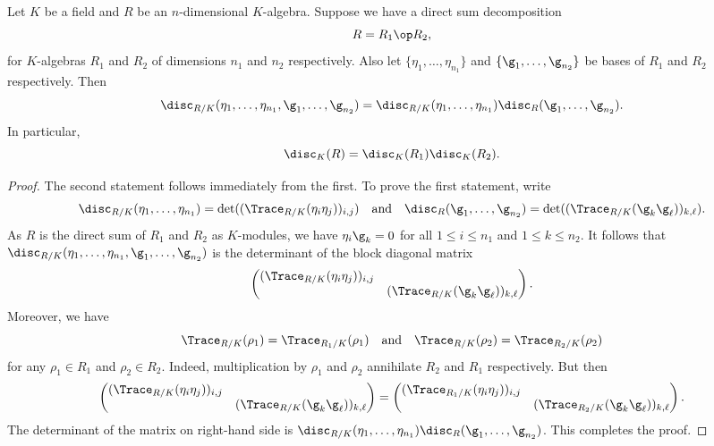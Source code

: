     \begin{proposition}\label{prop:discriminant_and_direct_sums}
      Let $K$ be a field and $R$ be an $n$-dimensional $K$-algebra. Suppose we have a direct sum decomposition
      \[
        R = R_{1} \op R_{2},
      \]
      for $K$-algebras $R_{1}$ and $R_{2}$ of dimensions $n_{1}$ and $n_{2}$ respectively. Also let $\{\eta_{1},\ldots,\eta_{n_{1}}\}$ and $\{\g_{1},\ldots,\g_{n_{2}}\}$ be bases of $R_{1}$ and $R_{2}$ respectively. Then
      \[
        \disc_{R/K}(\eta_{1},\ldots,\eta_{n_{1}},\g_{1},\ldots,\g_{n_{2}}) = \disc_{R/K}(\eta_{1},\ldots,\eta_{n_{1}})\disc_{R}(\g_{1},\ldots,\g_{n_{2}}).
      \]
      In particular,
      \[
        \disc_{K}(R) = \disc_{K}(R_{1})\disc_{K}(R_{2}).
      \]
    \end{proposition}
    \begin{proof}
      The second statement follows immediately from the first. To prove the first statement, write
      \[
        \disc_{R/K}(\eta_{1},\ldots,\eta_{n_{1}}) = \det((\Trace_{R/K}(\eta_{i}\eta_{j}))_{i,j}) \quad \text{and} \quad \disc_{R}(\g_{1},\ldots,\g_{n_{2}}) = \det((\Trace_{R/K}(\g_{k}\g_{\ell}))_{k,\ell}).
      \]
      As $R$ is the direct sum of $R_{1}$ and $R_{2}$ as $K$-modules, we have $\eta_{i}\g_{k} = 0$ for all $1 \le i \le n_{1}$ and $1 \le k \le n_{2}$. It follows that $\disc_{R/K}(\eta_{1},\ldots,\eta_{n_{1}},\g_{1},\ldots,\g_{n_{2}})$ is the determinant of the block diagonal matrix
      \[
        \begin{pmatrix} (\Trace_{R/K}(\eta_{i}\eta_{j}))_{i,j} & \\ & (\Trace_{R/K}(\g_{k}\g_{\ell}))_{k,\ell} \end{pmatrix}.
      \]
      Moreover, we have
      \[
        \Trace_{R/K}(\rho_{1}) = \Trace_{R_{1}/K}(\rho_{1}) \quad \text{and} \quad \Trace_{R/K}(\rho_{2}) = \Trace_{R_{2}/K}(\rho_{2})
      \]
      for any $\rho_{1} \in R_{1}$ and $\rho_{2} \in R_{2}$. Indeed, multiplication by $\rho_{1}$ and $\rho_{2}$ annihilate $R_{2}$ and $R_{1}$ respectively. But then
      \[
        \begin{pmatrix} (\Trace_{R/K}(\eta_{i}\eta_{j}))_{i,j} & \\ & (\Trace_{R/K}(\g_{k}\g_{\ell}))_{k,\ell} \end{pmatrix} = \begin{pmatrix} (\Trace_{R_{1}/K}(\eta_{i}\eta_{j}))_{i,j} & \\ & (\Trace_{R_{2}/K}(\g_{k}\g_{\ell}))_{k,\ell} \end{pmatrix}.
      \]
      The determinant of the matrix on right-hand side is $\disc_{R/K}(\eta_{1},\ldots,\eta_{n_{1}})\disc_{R}(\g_{1},\ldots,\g_{n_{2}})$. This completes the proof.
    \end{proof}
    
